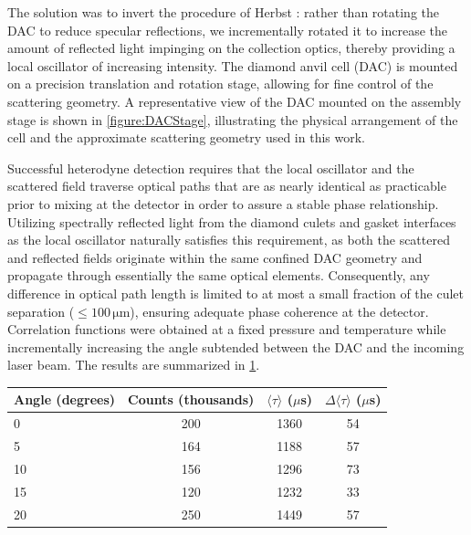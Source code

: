 The solution was to invert the procedure of Herbst \etal: rather than rotating the DAC to reduce specular reflections, we incrementally rotated it to increase the amount of reflected light impinging on the collection optics, thereby providing a local oscillator of increasing intensity. The diamond anvil cell (DAC) is mounted on a precision translation and rotation stage, allowing for fine control of the scattering geometry. A representative view of the DAC mounted on the assembly stage is shown in \fig \ref{figure:DACStage}, illustrating the physical arrangement of the cell and the approximate scattering geometry used in this work.  

Successful heterodyne detection requires that the local oscillator and the scattered field traverse optical paths that are as nearly identical as practicable prior to mixing at the detector in order to assure a stable phase relationship. Utilizing spectrally reflected light from the diamond culets and gasket interfaces as the local oscillator naturally satisfies this requirement, as both the scattered and reflected fields originate within the same confined DAC geometry and propagate through essentially the same optical elements. Consequently, any difference in optical path length is limited to at most a small fraction of the culet separation ($\leq 100\,\si{\micro\meter}$), ensuring adequate phase coherence at the detector.  Correlation functions were obtained at a fixed pressure and temperature while incrementally increasing the angle subtended between the DAC and the incoming laser beam. The results are summarized in \tbl \ref{table:HetHomo}.  

\begin{table}[!htbp]
	\centering
	
	\label{table:HetHomo}
	
	\begin{tabular}{lccc}
		\hline
		Angle (degrees) & Counts (thousands) & $\langle \tau \rangle$ ($\mu$s) & $\Delta \langle \tau \rangle$ ($\mu$s) \\
		\hline
		0  & 200 & 1360 & 54  \\
		5  & 164 & 1188 & 57  \\
		10 & 156 & 1296 & 73  \\
		15 & 120 & 1232 & 33  \\
		20 & 250 & 1449 & 57  \\
		\hline
	\end{tabular}
	
\end{table}

